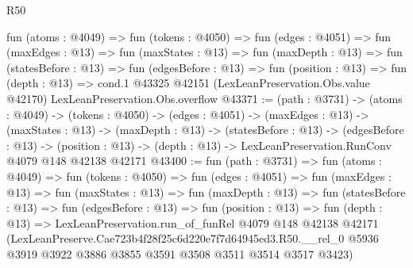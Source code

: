 \begin{lexlean}{R50}
\begin{coremodule}
  fun (atoms : @4049) =>
  fun (tokens : @4050) =>
  fun (edges : @4051) =>
  fun (maxEdges : @13) =>
  fun (maxStates : @13) =>
  fun (maxDepth : @13) =>
  fun (statesBefore : @13) =>
  fun (edgesBefore : @13) =>
  fun (position : @13) =>
  fun (depth : @13) =>
  cond.{1} @43325 @42151 (LexLeanPreservation.Obs.value @42170) LexLeanPreservation.Obs.overflow
@43371 := (path : @3731) ->
  (atoms : @4049) ->
  (tokens : @4050) ->
  (edges : @4051) ->
  (maxEdges : @13) ->
  (maxStates : @13) ->
  (maxDepth : @13) ->
  (statesBefore : @13) ->
  (edgesBefore : @13) ->
  (position : @13) -> (depth : @13) -> LexLeanPreservation.RunConv @4079 @148 @42138 @42171
@43400 := fun (path : @3731) =>
  fun (atoms : @4049) =>
  fun (tokens : @4050) =>
  fun (edges : @4051) =>
  fun (maxEdges : @13) =>
  fun (maxStates : @13) =>
  fun (maxDepth : @13) =>
  fun (statesBefore : @13) =>
  fun (edgesBefore : @13) =>
  fun (position : @13) =>
  fun (depth : @13) =>
  LexLeanPreservation.run_of_funRel
    @4079
    @148
    @42138
    @42171
    (LexLeanPreserve.Cae723b4f28f25c6d220e7f7d64945ed3.R50.__rel_0
      @5936
      @3919
      @3922
      @3886
      @3855
      @3591
      @3508
      @3511
      @3514
      @3517
      @3423)
\end{coremodule}
\end{lexlean}
